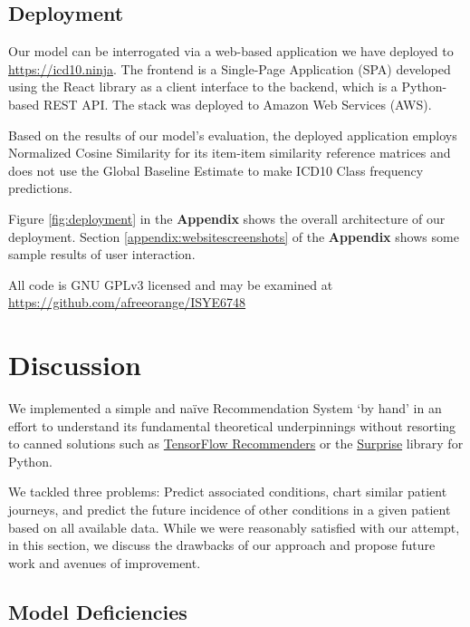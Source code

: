 \documentclass[twoside,11pt]{article}
\newcommand*\circled[1]{\tikz[baseline=(char.base)]{
            \node[shape=circle,draw,inner sep=1pt] (char) {#1};}}
\begin{document}
{\subsection{Deployment}

Our model can be interrogated via a web-based application we have deployed to \href{https://icd10.ninja}{https://icd10.ninja}. The frontend is a Single-Page Application (SPA) developed using the React library as a client interface to the backend, which is a Python-based REST API. The stack was deployed to Amazon Web Services (AWS).

Based on the results of our model's evaluation, the deployed application \circled{1} employs Normalized Cosine Similarity for its item-item similarity reference matrices and \circled{2} does not use the Global Baseline Estimate to make ICD10 Class frequency predictions.

Figure \ref{fig:deployment} in the \textbf{Appendix} shows the overall architecture of our deployment. Section \ref{appendix:websitescreenshots} of the \textbf{Appendix} shows some sample results of user interaction.

All code is GNU GPLv3 licensed and may be examined at \href{https://github.com/afreeorange/ISYE6748}{https://github.com/afreeorange/ISYE6748}


\section{Discussion}

We implemented a simple and na{\"i}ve Recommendation System `by hand' in an effort to understand its fundamental theoretical underpinnings without resorting to canned solutions such as \href{https://www.tensorflow.org/recommenders}{TensorFlow Recommenders} or the \href{https://surprise.readthedocs.io/en/stable/}{Surprise} library for Python. 

We tackled three problems: Predict associated conditions, chart similar patient journeys, and predict the future incidence of other conditions in a given patient based on all available data. While we were reasonably satisfied with our attempt, in this section, we discuss the drawbacks of our approach and propose future work and avenues of improvement.

\subsection{Model Deficiencies}

}
\end{document}
